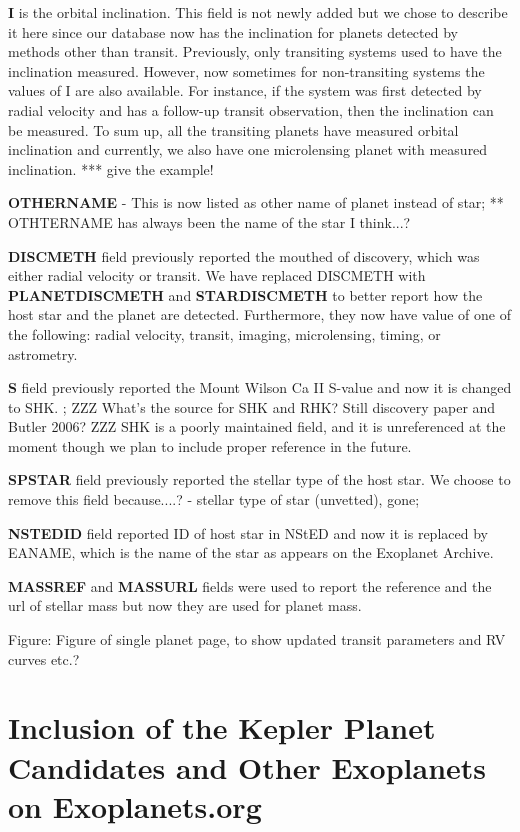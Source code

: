 \documentclass[11pt,preprint]{aastex}
\begin{document}
\begin{CJK*}{UTF8}{gbsn}
{\bf I} is the orbital inclination. This field is not newly added but
we chose to describe it here since our database now has the
inclination for planets detected by methods other than
transit. Previously, only transiting systems used to have the
inclination measured. However, now sometimes for non-transiting
systems the values of I are also available. For instance, if the
system was first detected by radial velocity and has a follow-up
transit observation, then the inclination can be measured. To sum up,
all the transiting planets have measured orbital inclination and
currently, we also have one microlensing planet with measured
inclination. *** give the example!


{\bf OTHERNAME} - This is now listed as other name of planet instead
of star; ** OTHTERNAME has always been the name of the star I
think...?

{\bf DISCMETH} field previously reported the mouthed of discovery,
which was either radial velocity or transit. We have replaced DISCMETH
with {\bf PLANETDISCMETH} and {\bf STARDISCMETH} to better report how
the host star and the planet are detected. Furthermore, they now have
value of one of the following: radial velocity, transit, imaging,
microlensing, timing, or astrometry.

{\bf S} field previously reported the Mount Wilson Ca II S-value and
now it is changed to SHK.  ; ZZZ What's the source for SHK and RHK?
Still discovery paper and Butler 2006? ZZZ SHK is a poorly maintained
field, and it is unreferenced at the moment though we plan to include
proper reference in the future.

{\bf SPSTAR} field previously reported the stellar type of the host
star. We choose to remove this field because....? - stellar type of
star (unvetted), gone;

{\bf NSTEDID} field reported ID of host star in NStED and now it is
replaced by EANAME, which is the name of the star as appears on the
Exoplanet Archive.

{\bf MASSREF} and {\bf MASSURL} fields were used to report the
reference and the url of stellar mass but now they are used for planet
mass.

Figure: Figure of single planet page, to show updated transit
parameters and RV curves etc.?


\section{Inclusion of the Kepler Planet Candidates and Other Exoplanets on Exoplanets.org}\label{sec:kepler}


\end{CJK*}
\end{document}
